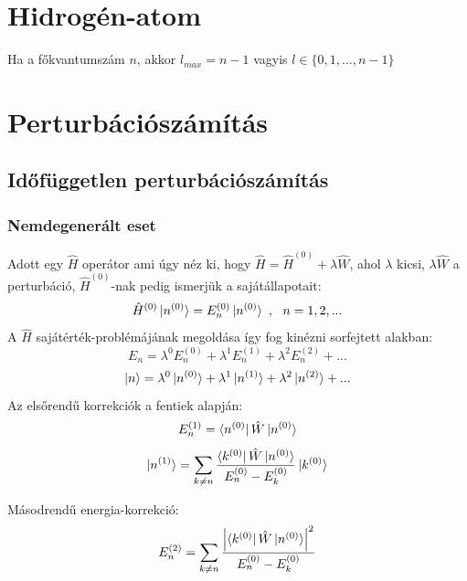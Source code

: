 \section{Hidrogén-atom}
\begin{megj}
    Ha a főkvantumszám $n$, akkor $l_{max}=n-1$ vagyis $l \in \{0,1,...,n-1\}$
\end{megj}
\section{Perturbációszámítás}
\subsection{Időfüggetlen perturbációszámítás}
\subsubsection{Nemdegenerált eset}
Adott egy $\hat H$ operátor ami úgy néz ki, hogy $\hat H = \hat H^{(0)} + \lambda \hat W$, ahol $\lambda$ kicsi, 
$\lambda\hat W$ a perturbáció, $\hat H^{(0)}$-nak pedig ismerjük a sajátállapotait:
\begin{equation}
    \hat H^{(0)} \ket{n^{(0)}} = E_n^{(0)} \ket{n^{(0)}} ~, ~~ n=1,2,... 
\end{equation}
A $\hat H$ sajátérték-problémájának megoldása így fog kinézni sorfejtett alakban:
\begin{equation}
    E_n = \lambda^0 E_n^{(0)} + \lambda^1 E_n^{(1)} + \lambda^2 E_n^{(2)} + ...
\end{equation}
\begin{equation}
  \ket n = \lambda^0 \ket{n^{(0)}} + \lambda^1 \ket{n^{(1)}} + \lambda^2 \ket{n^{(2)}} + ...  
\end{equation}
Az elsőrendű korrekciók a fentiek alapján:
\begin{equation}
    E_n^{(1)} = \bra{n^{(0)}} \hat W \ket{n^{(0)}}      
\end{equation}
\begin{equation}
    \ket{n^{(1)}} = \sum\limits_{k\neq n}\frac{\bra{k^{(0)}} \hat W \ket{n^{(0)}}}{E_n^{(0)}-E_k^{(0)}}
    \ket{k^{(0)}}
\end{equation}

Másodrendű energia-korrekció:
\begin{equation}
    E_n^{(2)} = \sum\limits_{k\neq n}\frac{\left|\bra{k^{(0)}} \hat W \ket{n^{(0)}}\right|^2}{E_n^{(0)}-E_k^{(0)}}    
\end{equation}

